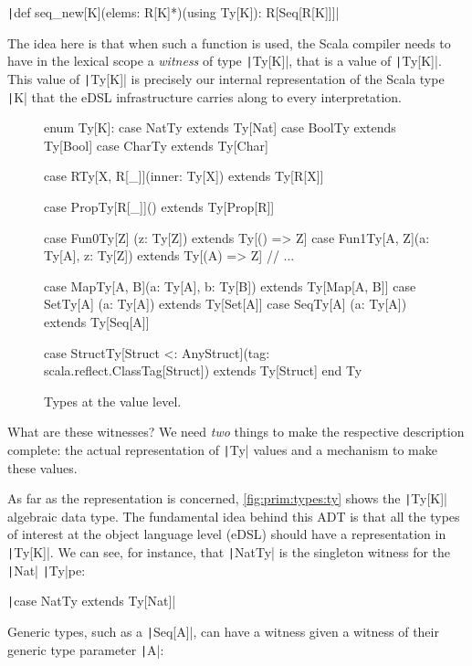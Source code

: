 \documentclass[11pt]{article}
\renewcommand{\vref}[1]{\autoref{#1} \vpageref{#1}}{}
\newcommand{\ScalaI}[1]{\texttt|#1|}
\newcommand{\OneTwoThreeX}[1]{\marginpar{\faCubes{ \smaller #1}}\xspace}
\newcommand{\FirstEtcX}[1]{\marginpar{\faCube{ \smaller #1}}\xspace}
\begin{document}
\ScalaI{def seq_new[K](elems: R[K]*)(using Ty[K]): R[Seq[R[K]]]}

\noindent The idea here is that when such a function is used, the Scala 
compiler needs to have in the lexical scope a \textit{witness} of type 
\ScalaI{Ty[K]}, that is a value of \ScalaI{Ty[K]}. This value of 
\ScalaI{Ty[K]} is precisely our internal representation of the Scala type 
\ScalaI{K} that the eDSL infrastructure carries along to every interpretation.

\begin{figure}[tb]
\begin{ScalaBlock}
enum Ty[K]:
  case NatTy    extends Ty[Nat]
  case BoolTy   extends Ty[Bool]
  case CharTy   extends Ty[Char]

  case RTy[X, R[_]](inner: Ty[X]) extends Ty[R[X]]
  
  case PropTy[R[_]]() extends Ty[Prop[R]]

  case Fun0Ty[Z]   (z: Ty[Z])           extends Ty[() => Z]
  case Fun1Ty[A, Z](a: Ty[A], z: Ty[Z]) extends Ty[(A) => Z]
  // ...

  case MapTy[A, B](a: Ty[A], b: Ty[B])  extends Ty[Map[A, B]]
  case SetTy[A]   (a: Ty[A])            extends Ty[Set[A]]
  case SeqTy[A]   (a: Ty[A])            extends Ty[Seq[A]]

  case StructTy[Struct <: AnyStruct](tag: scala.reflect.ClassTag[Struct])
      extends Ty[Struct]
end Ty
\end{ScalaBlock}
\caption{Types at the value level.}
\label{fig:prim:types:ty}
\hrulefill
\end{figure}

What are these witnesses? We need \textit{two}\OneTwoThreeX{1,2} things to 
make the respective description complete: the actual representation of 
\ScalaI{Ty} values and a mechanism to make these values.

As far as the representation\FirstEtcX{1} is concerned, 
\vref{fig:prim:types:ty} shows the \ScalaI{Ty[K]} algebraic data type. The 
fundamental idea behind this ADT is that all the types of interest at the 
object language level (eDSL) should have a representation in \ScalaI{Ty[K]}. 
We can see, for instance, that \ScalaI{NatTy} is the singleton witness for 
the \ScalaI{Nat} \ScalaI{Ty}pe:

\ScalaI{case NatTy extends Ty[Nat]}

\noindent Generic types, such as a \ScalaI{Seq[A]}, can have a witness given 
a witness of their generic type parameter \ScalaI{A}:
\end{document}
